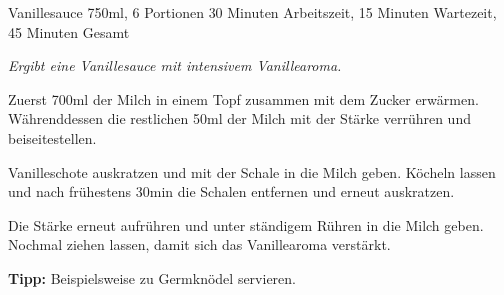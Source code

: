\begin{recipe}{Vanillesauce} {750ml, 6 Portionen} {30 Minuten Arbeitszeit, 15 Minuten Wartezeit, 45 Minuten Gesamt}

  \freeform{}\textit{Ergibt eine Vanillesauce mit intensivem Vanillearoma.}


  Zuerst 700ml der Milch in einem Topf zusammen mit dem Zucker erwärmen.
  Währenddessen die restlichen 50ml der Milch mit der Stärke verrühren und beiseitestellen.

  \newstep{}Vanilleschote auskratzen und mit der Schale in die Milch geben.
  Köcheln lassen und nach frühestens 30min die Schalen entfernen und erneut auskratzen.

  \newstep{}Die Stärke erneut aufrühren und unter ständigem Rühren in die Milch geben.
  Nochmal ziehen lassen, damit sich das Vanillearoma verstärkt.

  \freeform{}\hrulefill{}

  \freeform{}\textbf{Tipp:}
  Beispielsweise zu Germknödel servieren.

\end{recipe}
